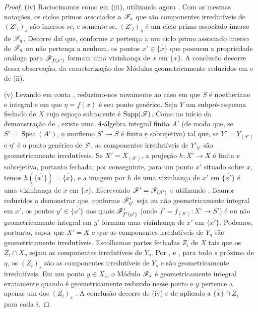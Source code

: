 \begin{proof}
(iv) Raciocinamos como em (iii), utilizando agora .
Com as mesmas notações, os ciclos primos associados a $\mathscr{F}_s$ que são componentes irredutíveis de $(Z'_i)_s$ são imersos se, e somente se, $(Z'_i)_\eta$ é um ciclo primo associado imerso de $\mathscr{F}_\eta$.
Decorre daí que, conforme $x$ pertença a um ciclo primo associado imerso de $\mathscr{F}_\eta$ ou não pertença a nenhum, os pontos $x'\in\overline{\{x\}}$ que possuem a propriedade análoga para $\mathscr{F}_{f(x')}$ formam uma vizinhança de $x$ em $\overline{\{x\}}$.
A conclusão decorre dessa observação, da caracterização dos Módulos geometricamente reduzidos em  e de (ii).

(v) Levando em conta , reduzimo-nos novamente ao caso em que $S$ é noetheriano e integral e em que $\eta=f(x)$ é seu ponto genérico.
Seja $Y$ um subpré-esquema fechado de $X$ cujo espaço subjacente é $\operatorname{Supp}(\mathscr{F})$.
Como no início da demonstração de , existe uma $A$-álgebra integral finita $A'$ (de modo que, se $S'=\operatorname{Spec}(A')$, o morfismo $S'\to S$ é finito e sobrejetivo) tal que, se $Y'=Y_{(S')}$ e $\eta'$ é o ponto genérico de $S'$, as componentes irredutíveis de $Y'_{\eta'}$ são geometricamente irredutíveis.
Se $X'=X_{(S')}$, a projeção $h:X'\to X$ é finita e sobrejetiva, portanto fechada; por conseguinte, para um ponto $x'$ situado sobre $x$, temos $h(\overline{\{x'\}})=\overline{\{x\}}$, e a imagem por $h$ de uma vizinhança de $x'$ em $\overline{\{x'\}}$ é uma vizinhança de $x$ em $\overline{\{x\}}$.
Escrevendo $\mathscr{F}'=\mathscr{F}_{(S')}$ e utilizando , ficamos reduzidos a demonstrar que, conforme $\mathscr{F}'_{\eta'}$ seja ou não geometricamente integral em $x'$, os pontos $y'\in\overline{\{x'\}}$ nos quais $\mathscr{F}'_{f'(y')}$ (onde $f'=f_{(S')}:X'\to S'$) é ou não geometricamente integral em $y'$ formam uma vizinhança de $x'$ em $\overline{\{x'\}}$.
Podemos, portanto, supor que $X'=X$ e que as componentes irredutíveis de $Y_\eta$ são geometricamente irredutíveis.
Escolhamos partes fechadas $Z_i$ de $X$ tais que os $Z_i\cap X_\eta$ sejam as
  componentes irredutíveis de $Y_\eta$.
Por ,  e , para todo $s$ próximo de $\eta$, os $(Z_i)_s$ são as componentes irredutíveis de $Y_s$ e são geometricamente irredutíveis.
Em um ponto $y\in X_s$, o Módulo $\mathscr{F}_s$ é geometricamente integral exatamente quando é geometricamente reduzido nesse ponto e $y$ pertence a apenas um dos $(Z_i)_s$ .
A conclusão decorre de (iv) e de  aplicado a $\overline{\{x\}}\cap Z_i$ para cada $i$.


\end{proof}
